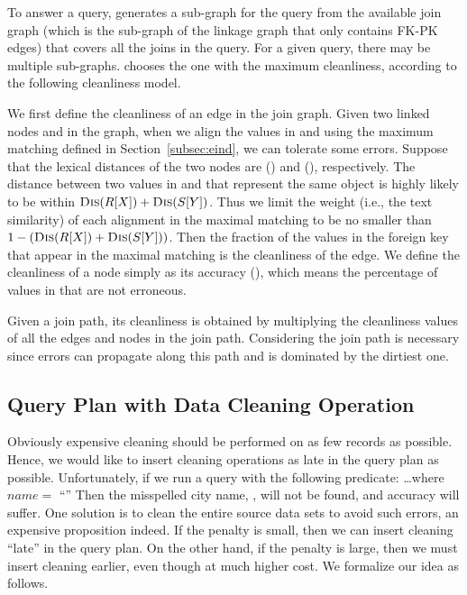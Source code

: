 To answer a query, \dcv generates a sub-graph for the query from the available join graph (which is the sub-graph of the linkage graph that only contains FK-PK edges) that covers all the joins in the query. 
For a given query, there may be multiple sub-graphs. 
\dcv chooses the one with the maximum cleanliness, according to the following cleanliness model.


We first define the cleanliness of an edge in the join graph. 
Given two linked nodes \RX and \SY in the graph, when we align the values in \RX and \SY using the maximum matching  defined in Section~\ref{subsec:eind}, we can tolerate some errors. Suppose that the lexical distances of the two nodes are \Dis(\RX) and \Dis(\SY), respectively. The distance between two values in \RX and \SY that represent the same object is highly likely to be within $\textsc{Dis}(R[X]) + \textsc{Dis}(S[Y])$. Thus we limit the weight (i.e., the text similarity) of each alignment in the maximal matching to be no smaller than $1-(\textsc{Dis}(R[X])+\textsc{Dis}(S[Y]))$. 
Then the fraction of the values in the foreign key that appear in the maximal matching is the cleanliness of the edge. We define the cleanliness of a node \RX simply as its accuracy \Acc(\RX), which means the percentage of values in \RX that are not erroneous.

Given a join path, its cleanliness is obtained by multiplying the cleanliness values of all the edges and nodes in the join path. Considering the join path is necessary since errors can propagate along this path and is dominated by the dirtiest one.



\subsection{Query Plan with Data Cleaning Operation}
\label{subsec:gain}

Obviously expensive cleaning should be performed on as few records as possible. Hence, we would like to insert cleaning operations as late in the query plan as possible. 
Unfortunately, if we run a query with the following predicate:
\vspace{.5em}
\dots \textsf{where} $name = $ ``''
\vspace{.5em}
\noindent Then the misspelled city name,  \ie {}, will not be found, and accuracy will suffer. One solution is to clean the entire source data sets to avoid such errors, an expensive proposition indeed. If the penalty is small, then we can insert cleaning ``late'' in the query plan. On the other hand, if the penalty is large, then we must insert cleaning earlier, even though at much higher cost. We formalize our idea as follows.


